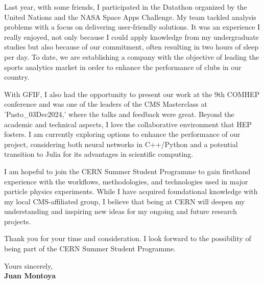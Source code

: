 \documentclass[11pt]{report}
\begin{document}
\begin{titlepage}
\vspace{0.7em}

Last year, with some friends, I participated in the Datathon organized by the United Nations and the NASA Space Apps Challenge. My team tackled analysis problems with a focus on delivering user-friendly solutions. It was an experience I really enjoyed, not only because I could apply knowledge from my undergraduate studies but also because of our commitment, often resulting in two hours of sleep per day. To date, we are establishing a company with the objective of leading the sports analytics market in order to enhance the performance of clubs in our country.

\vspace{0.7em}

With GFIF, I also had the opportunity to present our work at the 9th COMHEP conference and was one of the leaders of the CMS Masterclass at 'Pasto\_03Dec2024,' where the talks and feedback were great. Beyond the academic and technical aspects, I love the collaborative environment that HEP fosters. I am currently exploring options to enhance the performance of our project, considering both neural networks in C++/Python and a potential transition to Julia for its advantages in scientific computing.

\vspace{0.7em}

I am hopeful to join the CERN Summer Student Programme to gain firsthand experience with the workflows, methodologies, and technologies used in major particle physics experiments. While I have acquired foundational knowledge with my local CMS-affiliated group, I believe that being at CERN will deepen my understanding and inspiring new ideas for my ongoing and future research projects.

\vspace{0.7em}

Thank you for your time and consideration. I look forward to the possibility of being part of the CERN Summer Student Programme.

\vspace{0.7em}


\raggedright Yours sincerely,\\
\textbf{Juan Montoya}

\end{titlepage}
\end{document}
